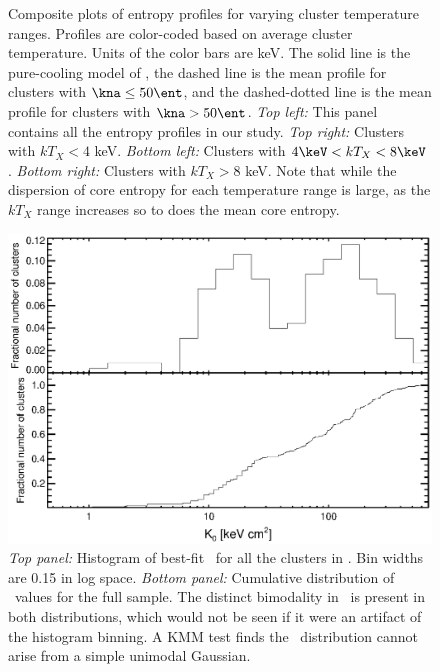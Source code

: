 \begin{center}
\begin{figure}[htp]
    \caption{Composite plots of entropy profiles for varying cluster
    temperature ranges. Profiles are color-coded based on average
    cluster temperature. Units of the color bars are keV. The
    solid line is the pure-cooling model of \cite{voitbryan}, the
    dashed line is the mean profile for clusters with $\kna \le 50
    \ent$, and the dashed-dotted line is the mean profile for clusters
    with $\kna > 50 \ent$. {\it{Top left:}} This panel contains all
    the entropy profiles in our study. {\it{Top right:}} Clusters with
    $kT_X < 4$ keV. {\it{Bottom left:}} Clusters with $4\keV < kT_X <
    8\keV$. {\it{Bottom right:}} Clusters with $kT_X > 8$ keV. Note that
    while the dispersion of core entropy for each temperature range is
    large, as the $kT_X$ range increases so to does the mean core
    entropy.}
    \label{fig:splots}
  \end{figure}
\end{center}

\clearpage
\begin{figure}[htp]
  \begin{center}
    \begin{minipage}[htp]{0.9\linewidth}
      \includegraphics*[width=\textwidth, trim=20mm 10mm 10mm 10mm, clip]{k0hist.eps}
      \caption{{\it{Top panel:}} Histogram of best-fit \kna\ for all
      the clusters in \accept. Bin widths are 0.15 in log space.
      {\it{Bottom panel:}} Cumulative distribution of \kna\ values for
      the full sample. The distinct bimodality in \kna\ is present in
      both distributions, which would not be seen if it were an
      artifact of the histogram binning. A KMM test finds the \kna\
      distribution cannot arise from a simple unimodal Gaussian.}
      \label{fig:k0hist}
    \end{minipage}
  \end{center}
\end{figure}

